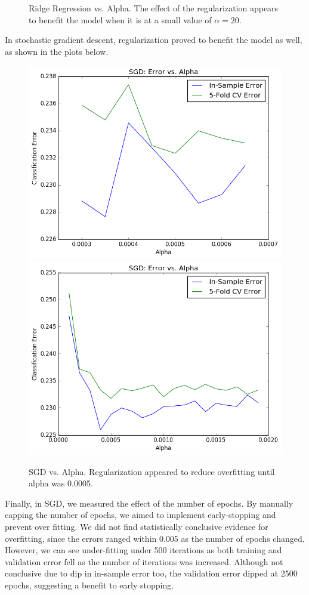 \begin{itemize}
\begin{itemize}
\begin{figure}[H]
\caption{Ridge Regression vs. Alpha. The effect of the regularization appears to benefit the model when it is at a small value of $\alpha=20$.}
\end{figure}
In stochastic gradient descent, regularization proved to benefit the model as well, as shown in the plots below.
\begin{figure}[H]
\centering
\includegraphics[scale=0.35]{sgd-vs-alpha}
\includegraphics[scale=0.35]{sgd-vs-alpha2}
\caption{SGD vs. Alpha. Regularization appeared to reduce overfitting until alpha was 0.0005.}
\end{figure}
Finally, in SGD, we measured the effect of the number of epochs. By manually capping the number of epochs, we aimed to implement early-stopping and prevent over fitting. We did not find statistically conclusive evidence for overfitting, since the errors ranged within 0.005 as the number of epochs changed. However, we can see under-fitting under 500 iterations as both training and validation error fell as the number of iterations was increased. Although not conclusive due to dip in in-sample error too, the validation error dipped at 2500 epochs, suggesting a benefit to early stopping.

\end{itemize}
\end{itemize}
